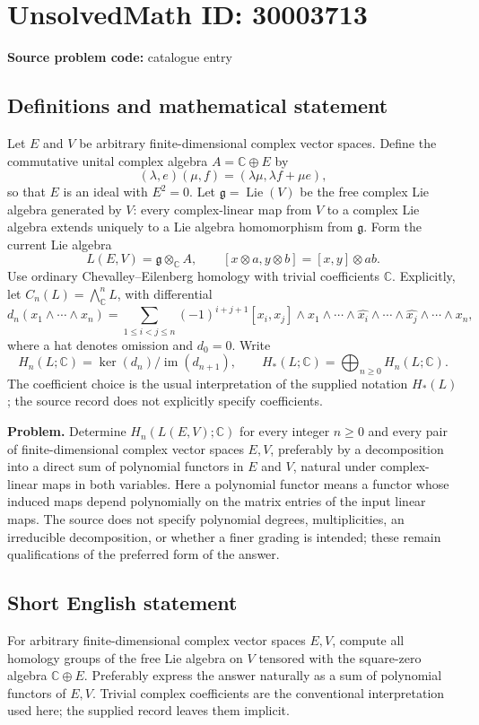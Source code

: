 \documentclass[11pt]{article}
\newcommand{\C}{\mathbb{C}}
\begin{document}
\section*{UnsolvedMath ID: 30003713}
\textbf{Source problem code:} catalogue entry
\subsection{Definitions and mathematical statement}
Let \(E\) and \(V\) be arbitrary finite-dimensional complex vector spaces. Define the commutative unital complex algebra \(A=\C\oplus E\) by
\[
(\lambda,e)(\mu,f)=(\lambda\mu,\lambda f+\mu e),
\]
so that \(E\) is an ideal with \(E^2=0\). Let \(\mathfrak g=\operatorname{Lie}(V)\) be the free complex Lie algebra generated by \(V\): every complex-linear map from \(V\) to a complex Lie algebra extends uniquely to a Lie algebra homomorphism from \(\mathfrak g\). Form the current Lie algebra
\[
L(E,V)=\mathfrak g\otimes_{\C}A,
\qquad [x\otimes a,y\otimes b]=[x,y]\otimes ab.
\]
Use ordinary Chevalley--Eilenberg homology with trivial coefficients \(\C\). Explicitly, let \(C_n(L)=\bigwedge^n_{\C}L\), with differential
\[
d_n(x_1\wedge\cdots\wedge x_n)
=\sum_{1\leq i<j\leq n}(-1)^{i+j+1}[x_i,x_j]\wedge x_1\wedge\cdots\wedge\widehat{x_i}\wedge\cdots\wedge\widehat{x_j}\wedge\cdots\wedge x_n,
\]
where a hat denotes omission and \(d_0=0\). Write
\[
H_n(L;\C)=\ker(d_n)/\operatorname{im}(d_{n+1}),
\qquad H_*(L;\C)=\bigoplus_{n\geq0}H_n(L;\C).
\]
The coefficient choice is the usual interpretation of the supplied notation \(H_*(L)\); the source record does not explicitly specify coefficients.

\textbf{Problem.} Determine \(H_n(L(E,V);\C)\) for every integer \(n\geq0\) and every pair of finite-dimensional complex vector spaces \(E,V\), preferably by a decomposition into a direct sum of polynomial functors in \(E\) and \(V\), natural under complex-linear maps in both variables. Here a polynomial functor means a functor whose induced maps depend polynomially on the matrix entries of the input linear maps. The source does not specify polynomial degrees, multiplicities, an irreducible decomposition, or whether a finer grading is intended; these remain qualifications of the preferred form of the answer.
\subsection{Short English statement}
For arbitrary finite-dimensional complex vector spaces \(E,V\), compute all homology groups of the free Lie algebra on \(V\) tensored with the square-zero algebra \(\C\oplus E\). Preferably express the answer naturally as a sum of polynomial functors of \(E,V\). Trivial complex coefficients are the conventional interpretation used here; the supplied record leaves them implicit.
\end{document}
